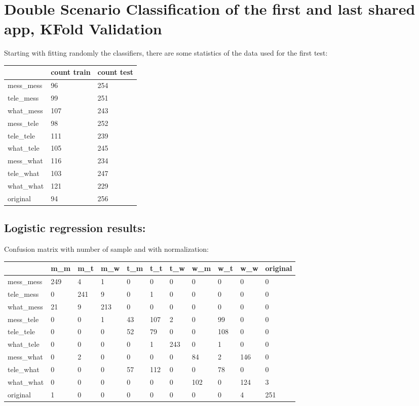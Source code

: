 

\chapter{Double Scenario Classification of the first and last shared app, KFold Validation}

Starting with fitting randomly the classifiers, there are some statistics of the data used for the first test: \\
 {\def\arraystretch{1.3} 
 \begin{table}[H] 
\centering 
\begin{tabular}{|l|l|l|} 
\hline 
  &count train  &count test  \\ \hline
mess\_mess  &96  &254  \\ \hline
tele\_mess  &99  &251  \\ \hline
what\_mess  &107  &243  \\ \hline
mess\_tele  &98  &252  \\ \hline
tele\_tele  &111  &239  \\ \hline
what\_tele  &105  &245  \\ \hline
mess\_what  &116  &234  \\ \hline
tele\_what  &103  &247  \\ \hline
what\_what  &121  &229  \\ \hline
original  &94  &256  \\ \hline
\end{tabular} 
\end{table} }
\section{Logistic regression results:} 
Confusion matrix with number of sample and with normalization:
 {\def\arraystretch{1.3} 
 \begin{table}[H] 
\centering 
\begin{tabular}{|l|l|l|l|l|l|l|l|l|l|l|} 
\hline 
  &m\_m  &m\_t  &m\_w  &t\_m  &t\_t  &t\_w  &w\_m  &w\_t  &w\_w  &original  \\ \hline
mess\_mess  &249  &4  &1  &0  &0  &0  &0  &0  &0  &0  \\ \hline
tele\_mess  &0  &241  &9  &0  &1  &0  &0  &0  &0  &0  \\ \hline
what\_mess  &21  &9  &213  &0  &0  &0  &0  &0  &0  &0  \\ \hline
mess\_tele  &0  &0  &1  &43  &107  &2  &0  &99  &0  &0  \\ \hline
tele\_tele  &0  &0  &0  &52  &79  &0  &0  &108  &0  &0  \\ \hline
what\_tele  &0  &0  &0  &0  &1  &243  &0  &1  &0  &0  \\ \hline
mess\_what  &0  &2  &0  &0  &0  &0  &84  &2  &146  &0  \\ \hline
tele\_what  &0  &0  &0  &57  &112  &0  &0  &78  &0  &0  \\ \hline
what\_what  &0  &0  &0  &0  &0  &0  &102  &0  &124  &3  \\ \hline
original  &1  &0  &0  &0  &0  &0  &0  &0  &4  &251  \\ \hline
\end{tabular} 
\end{table} }

